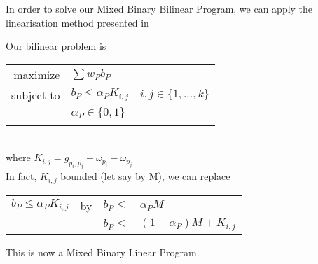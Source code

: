 In order to solve our Mixed Binary Bilinear Program, we can apply the linearisation method presented in  \cite{glover}

Our bilinear problem is\\
\begin{tabular}{rll}
maximize & $\sum w_P b_P$ & \\
subject to & $b_P \leq \alpha_P K_{i,j}$ & $i,j \in \{1,...,k\}$\\
 & $\alpha_P \in \{0,1\}$ & \\
  & & \\
\end{tabular}\\
where $K_{i,j} = g_{p_i,p_j}+\omega_{p_i} - \omega_{p_j}$\\
In fact, $K_{i,j}$ bounded (let say by M), we can replace\\
\begin{center}
\begin{tabular}{llll}
$b_P \leq \alpha_P K_{i,j}$ & by &
$b_P \leq$ & $\alpha_P M$\\
 & & $b_P \leq$ & $(1-\alpha_P)M + K_{i,j}$
\end{tabular}
\end{center}
This is now a Mixed Binary Linear Program.